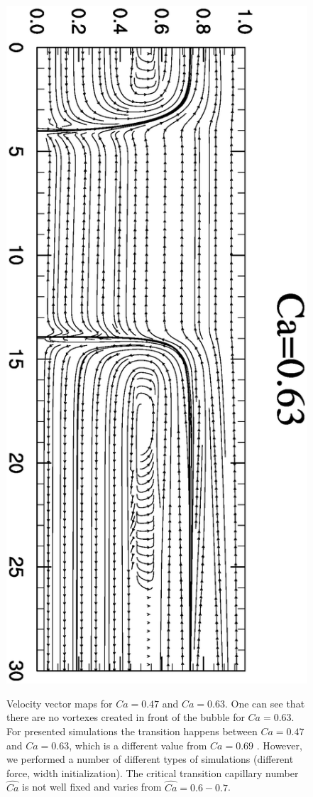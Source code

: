 \documentclass[preprint,12pt]{elsarticle}
\begin{document}
\begin{figure}[ht]
\includegraphics[angle=90,width=\textwidth]{stream_ca63.eps}\\
\caption{Velocity vector maps for $Ca=0.47$ and $Ca=0.63$. One can see that there are no vortexes
created
in front of the bubble for $Ca=0.63$. For presented simulations the transition happens between
$Ca=0.47$ and $Ca=0.63$, which
is a different value from $Ca=0.69$ \cite{heil-threedim}. However, we performed a number of
different types of simulations (different force, width initialization). The critical transition
capillary number $\widehat{Ca}$ is not well fixed and varies from $\widehat{Ca}=0.6-0.7$.  
\label{fig:streamlines:pattern}}
\end{figure}
\end{document}
